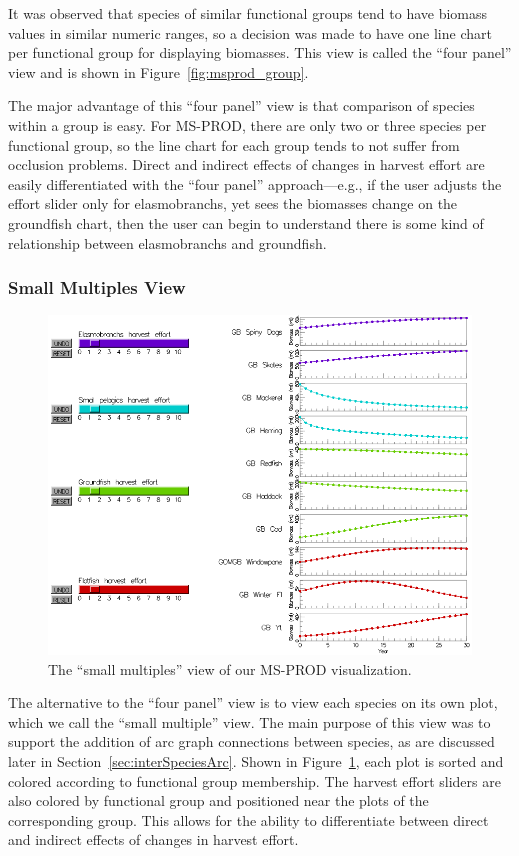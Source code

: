 It was observed that species of similar functional groups tend to have biomass values in similar numeric ranges, so a decision was made to have one line chart per functional group for displaying biomasses.  This view is called the ``four panel'' view and is shown in Figure~\ref{fig:msprod_group}.

The major advantage of this ``four panel'' view is that comparison of species within a group is easy.  For MS-PROD, there are only two or three species per functional group, so the line chart for each group tends to not suffer from occlusion problems.  Direct and indirect effects of changes in harvest effort are easily differentiated with the ``four panel'' approach---e.g., if the user adjusts the effort slider only for elasmobranchs, yet sees the biomasses change on the groundfish chart, then the user can begin to understand there is some kind of relationship between elasmobranchs and groundfish.

\subsubsection{Small Multiples View}

\begin{figure}[h]
	\centering
	\includegraphics[width=12cm]{figures/png/msprod_species.png}
	\caption[The ``small multiples'' view of our MS-PROD visualization]{The ``small multiples'' view of our MS-PROD visualization.}
	\label{fig:msprod_species}
\end{figure}

The alternative to the ``four panel'' view is to view each species on its own plot, which we call the ``small multiple'' view.  The main purpose of this view was to support the addition of arc graph connections between species, as are discussed later in Section~\ref{sec:interSpeciesArc}. Shown in Figure~\ref{fig:msprod_species}, each plot is sorted and colored according to functional group membership.  The harvest effort sliders are also colored by functional group and positioned near the plots of the corresponding group.  This allows for the ability to differentiate between direct and indirect effects of changes in harvest effort.

